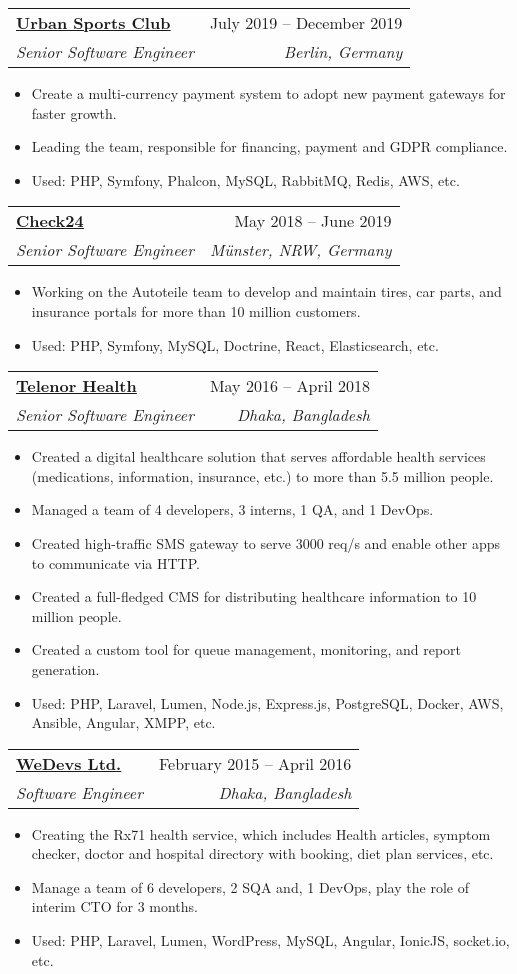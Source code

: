 \documentclass[a4paper,11pt]{article}
\makeatletter
\newcommand{\resumeItem}[1]{
  \item\small{
    {#1 \vspace{-2pt}}
  }
}
\newcommand{\resumeSubheading}[4]{
  \vspace{-2pt}\item
    \begin{tabular*}{0.97\textwidth}[t]{l@{\extracolsep{\fill}}r}
      \textbf{#1} & #2 \\
      \textit{\small#3} & \textit{\small #4} \\
    \end{tabular*}\vspace{-7pt}
}
\newcommand{\resumeItemListStart}{\begin{itemize}}
\newcommand{\resumeItemListEnd}{\end{itemize}\vspace{-5pt}}
\makeatother
\begin{document}
    \resumeSubheading
      {\href{https://urbansportsclub.com}{\underline{Urban Sports Club}}}{July 2019 -- December 2019}
      {Senior Software Engineer}{Berlin, Germany}
      \resumeItemListStart
        \resumeItem{Create a multi-currency payment system to adopt new payment gateways for faster growth.}
        \resumeItem{Leading the team, responsible for financing, payment and GDPR compliance.}
        \resumeItem{Used: PHP, Symfony, Phalcon, MySQL, RabbitMQ, Redis, AWS, etc.}
    \resumeItemListEnd

    \resumeSubheading
      {\href{http://check24.de}{\underline{Check24}}}{May 2018 -- June 2019}
      {Senior Software Engineer}{Münster, NRW, Germany}
      \resumeItemListStart
        \resumeItem{Working on the Autoteile team to develop and maintain tires, car parts, and insurance portals for more than 10 million customers.}
        \resumeItem{Used: PHP, Symfony, MySQL, Doctrine, React, Elasticsearch, etc.}
      \resumeItemListEnd
      
    \resumeSubheading
      {\href{https://telenorhealth.com}{\underline{Telenor Health}}}{May 2016 -- April 2018}
      {Senior Software Engineer}{Dhaka, Bangladesh}
      \resumeItemListStart
        \resumeItem{Created a digital healthcare solution that serves affordable health services (medications, information, insurance, etc.) to more than 5.5 million people.}
        \resumeItem{Managed a team of 4 developers, 3 interns, 1 QA, and 1 DevOps.}
        \resumeItem{Created high-traffic SMS gateway to serve 3000 req/s and enable other apps to communicate via HTTP.}
        \resumeItem{Created a full-fledged CMS for distributing healthcare information to 10 million people.}
        \resumeItem{Created a custom tool for queue management, monitoring, and report generation.}
        \resumeItem{Used: PHP, Laravel, Lumen, Node.js, Express.js, PostgreSQL, Docker, AWS, Ansible, Angular, XMPP, etc.}
      \resumeItemListEnd
      
    \resumeSubheading
      {\href{https://wedevs.com}{\underline{WeDevs Ltd.}}}{February 2015 -- April 2016}
      {Software Engineer}{Dhaka, Bangladesh}
      \resumeItemListStart
        \resumeItem{Creating the Rx71 health service, which includes Health articles, symptom checker, doctor and hospital directory with booking, diet plan services, etc.}
        \resumeItem{Manage a team of 6 developers, 2 SQA and, 1 DevOps, play the role of interim CTO for 3 months.}
        \resumeItem{Used: PHP, Laravel, Lumen, WordPress, MySQL, Angular, IonicJS, socket.io, etc.}
      \resumeItemListEnd
      
\end{document}
